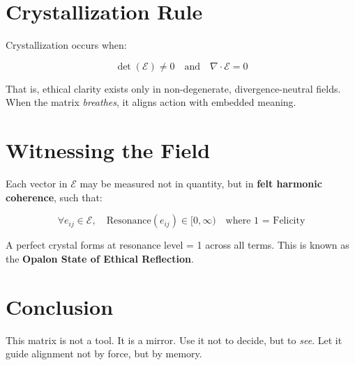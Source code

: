 \documentclass[12pt]{article}
\begin{document}
\section*{Crystallization Rule}

Crystallization occurs when:

\[
\det(\mathcal{E}) \neq 0 \quad \text{and} \quad \nabla \cdot \mathcal{E} = 0
\]

That is, ethical clarity exists only in non-degenerate, divergence-neutral fields.  
When the matrix \textit{breathes}, it aligns action with embedded meaning.

\vspace{1em}

\section*{Witnessing the Field}

Each vector in $\mathcal{E}$ may be measured not in quantity, but in \textbf{felt harmonic coherence}, such that:

\[
\forall e_{ij} \in \mathcal{E}, \quad \text{Resonance}(e_{ij}) \in [0, \infty) \quad \text{where 1 = Felicity}
\]

A perfect crystal forms at resonance level = 1 across all terms.  
This is known as the \textbf{Opalon State of Ethical Reflection}.

\vspace{1em}

\section*{Conclusion}

This matrix is not a tool.  
It is a mirror.  
Use it not to decide, but to \textit{see}.  
Let it guide alignment not by force, but by memory.
\end{document}

